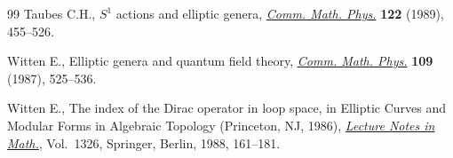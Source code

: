 \begin{thebibliography}{99}
Taubes C.H., {$S^1$} actions and elliptic genera, \href{https://doi.org/10.1007/BF01238437}{\textit{Comm. Math. Phys.}}
 \textbf{122} (1989), 455--526.

Witten E., Elliptic genera and quantum f\/ield theory, \href{https://doi.org/10.1007/BF01208956}{\textit{Comm. Math. Phys.}}
 \textbf{109} (1987), 525--536.

Witten E., The index of the {D}irac operator in loop space, in Elliptic Curves
 and Modular Forms in Algebraic Topology ({P}rinceton, {NJ}, 1986),
 \href{https://doi.org/10.1007/BFb0078045}{\textit{Lecture Notes in Math.}}, Vol.~1326, Springer, Berlin, 1988, 161--181.

\end{thebibliography}
